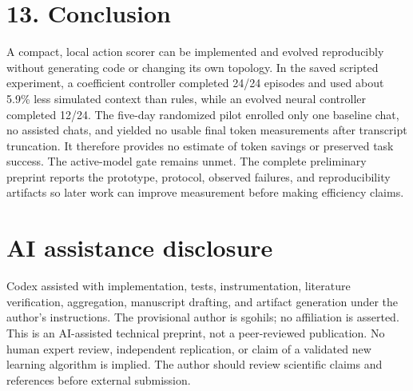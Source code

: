 \documentclass[11pt]{article}
\begin{document}
\section*{13. Conclusion}
A compact, local action scorer can be implemented and evolved reproducibly without generating code or changing its own topology. In the saved scripted experiment, a coefficient controller completed 24/24 episodes and used about 5.9\% less simulated context than rules, while an evolved neural controller completed 12/24. The five-day randomized pilot enrolled only one baseline chat, no assisted chats, and yielded no usable final token measurements after transcript truncation. It therefore provides no estimate of token savings or preserved task success. The active-model gate remains unmet. The complete preliminary preprint reports the prototype, protocol, observed failures, and reproducibility artifacts so later work can improve measurement before making efficiency claims.

\section*{AI assistance disclosure}
Codex assisted with implementation, tests, instrumentation, literature verification, aggregation, manuscript drafting, and artifact generation under the author's instructions. The provisional author is sgohils; no affiliation is asserted. This is an AI-assisted technical preprint, not a peer-reviewed publication. No human expert review, independent replication, or claim of a validated new learning algorithm is implied. The author should review scientific claims and references before external submission.
\end{document}
